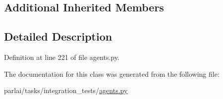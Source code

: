 \subsection*{Additional Inherited Members}


\subsection{Detailed Description}


Definition at line 221 of file agents.\+py.



The documentation for this class was generated from the following file\+:\begin{DoxyCompactItemize}
\item 
parlai/tasks/integration\+\_\+tests/\hyperlink{parlai_2tasks_2integration__tests_2agents_8py}{agents.\+py}\end{DoxyCompactItemize}
